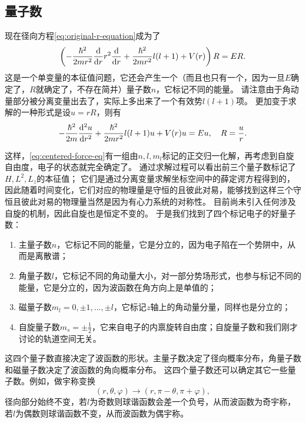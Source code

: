 \subsection{量子数}\label{sec:quantum-number}

现在径向方程\eqref{eq:original-r-equation}成为了
\begin{equation}
    \left( - \frac{\hbar^2}{2m r^2} \dv{r} r^2 \dv{r} + \frac{\hbar^2}{2m r^2} l(l+1) + V(r) \right) R = E R.
    \label{eq:r-equation}
\end{equation}
这是一个单变量的本征值问题，它还会产生一个（而且也只有一个，因为一旦$E$确定了，$R$就确定了，不存在简并）量子数$n$，它标记不同的能量。
请注意由于角动量部分被分离变量出去了，实际上多出来了一个有效势$l(l+1)$项。
更加变于求解的一种形式是设$u=rR$，则有
\begin{equation}
    - \frac{\hbar^2}{2m} \dv[2]{u}{r} + \frac{\hbar^2}{2m r^2} l(l+1) u + V(r) u = Eu, \quad R = \frac{u}{r}.
\end{equation}

这样，\eqref{eq:centered-force-eq}有一组由$n, l, m_l$标记的正交归一化解，再考虑到自旋自由度，电子的状态就完全确定了。
通过求解过程可以看出前三个量子数标记了${H}, {L}^2, {L}_z$的本征值；
它们是通过分离变量求解坐标空间中的薛定谔方程得到的，因此随着时间变化，它们对应的物理量是守恒的且彼此对易，能够找到这样三个守恒且彼此对易的物理量当然是因为有心力系统的对称性。
目前尚未引入任何涉及自旋的机制，因此自旋也是恒定不变的。
于是我们找到了四个标记电子的好量子数：
\begin{enumerate}
    \item 主量子数$n$，它标记不同的能量，它是分立的，因为电子陷在一个势阱中，从而是离散谱；
    \item 角量子数$l$，它标记不同的角动量大小，对一部分势场形式，也参与标记不同的能量，它是分立的，因为波函数在角方向上是单值的；
    \item 磁量子数$m_l = 0, \pm 1, \ldots, \pm l$，它标记$z$轴上的角动量分量，同样也是分立的；
    \item 自旋量子数$m_s = \pm \frac{1}{2}$，它来自电子的内禀旋转自由度；自旋量子数和我们刚才讨论的轨道空间无关。
\end{enumerate}

这四个量子数直接决定了波函数的形状。主量子数决定了径向概率分布，角量子数和磁量子数决定了波函数的角向概率分布。
这四个量子数还可以确定其它一些量子数。例如，做宇称变换
\[
    (r, \theta, \varphi) \longrightarrow (r, \pi - \theta, \pi + \varphi),
\]
径向部分始终不变，若$l$为奇数则球谐函数会差一个负号，从而波函数为奇宇称，若$l$为偶数则球谐函数不变，从而波函数为偶宇称。

